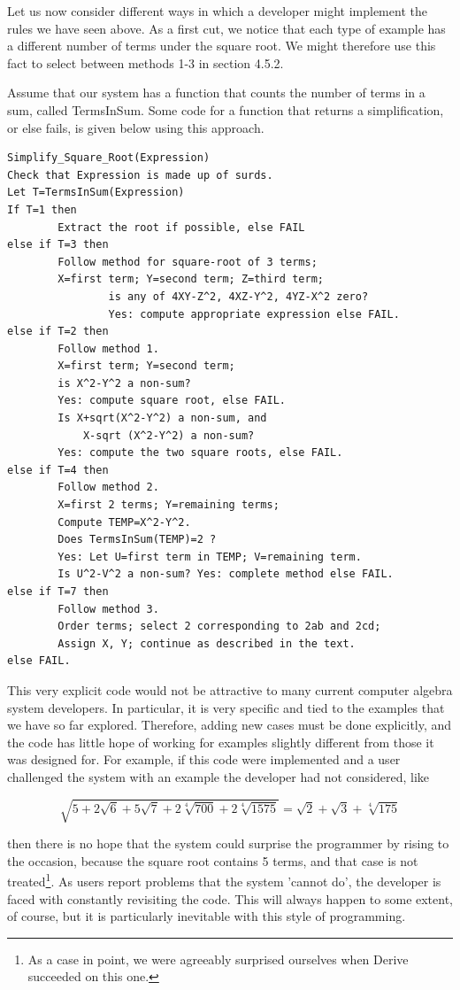 \documentclass[11pt,letterpaper]{article}
\begin{document}
Let us now consider different ways in which a developer might implement the rules we have seen above. As a first cut, we notice that each type of example has a different number of terms under the square root. We might therefore use this fact to select between methods 1-3 in section 4.5.2.

Assume that our system has a function that counts the number of terms in a sum, called TermsInSum. Some code for a function that returns a simplification, or else fails, is given below using this approach.

\begin{verbatim}
Simplify_Square_Root(Expression)
Check that Expression is made up of surds.
Let T=TermsInSum(Expression)
If T=1 then
        Extract the root if possible, else FAIL
else if T=3 then
        Follow method for square-root of 3 terms;
        X=first term; Y=second term; Z=third term;
                is any of 4XY-Z^2, 4XZ-Y^2, 4YZ-X^2 zero?
                Yes: compute appropriate expression else FAIL.
else if T=2 then
        Follow method 1.
        X=first term; Y=second term;
        is X^2-Y^2 a non-sum?
        Yes: compute square root, else FAIL.
        Is X+sqrt(X^2-Y^2) a non-sum, and
            X-sqrt (X^2-Y^2) a non-sum?
        Yes: compute the two square roots, else FAIL.
else if T=4 then
        Follow method 2.
        X=first 2 terms; Y=remaining terms;
        Compute TEMP=X^2-Y^2.
        Does TermsInSum(TEMP)=2 ?
        Yes: Let U=first term in TEMP; V=remaining term.
        Is U^2-V^2 a non-sum? Yes: complete method else FAIL.
else if T=7 then
        Follow method 3.
        Order terms; select 2 corresponding to 2ab and 2cd;
        Assign X, Y; continue as described in the text.
else FAIL.
\end{verbatim}

This very explicit code would not be attractive to many current computer algebra system developers. In particular, it is very specific and tied to the examples that we have so far explored. Therefore, adding new cases must be done explicitly, and the code has little hope of working for examples slightly different from those it was designed for. For example, if this code were implemented and a user challenged the system with an example the developer had not considered, like

\[
\sqrt{5+2 \sqrt{6}+5 \sqrt{7}+2 \sqrt[4]{700}+2 \sqrt[4]{1575}}=\sqrt{2}+\sqrt{3}+\sqrt[4]{175}
\]

then there is no hope that the system could surprise the programmer by rising to the occasion, because the square root contains 5 terms, and that case is not treated\footnote{As a case in point, we were agreeably surprised ourselves when Derive succeeded on this one.}. As users report problems that the system 'cannot do', the developer is faced with constantly revisiting the code. This will always happen to some extent, of course, but it is particularly inevitable with this style of programming.
\end{document}
